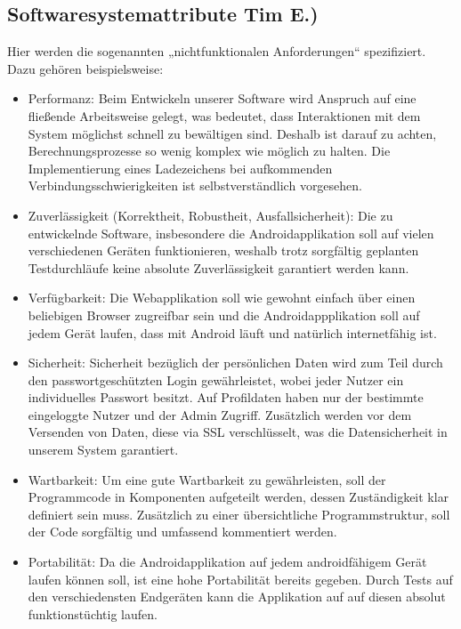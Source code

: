 \documentclass[fontsize=12pt,paper=a4,twoside]{scrartcl}
\begin{document}
\subsection{Softwaresystemattribute Tim E.)}
\label{sec:softwaresystemattribute}

  Hier werden die sogenannten „nichtfunktionalen Anforderungen“ spezifiziert. Dazu gehören beispielsweise: 
\begin{itemize}
	\item Performanz: Beim Entwickeln unserer Software wird Anspruch auf eine fließende Arbeitsweise gelegt, was bedeutet, dass Interaktionen mit dem System möglichst schnell zu bewältigen sind. Deshalb ist darauf zu achten, Berechnungsprozesse so wenig komplex wie möglich zu halten. Die Implementierung eines Ladezeichens bei aufkommenden Verbindungsschwierigkeiten ist selbstverständlich vorgesehen.
	
	\item Zuverlässigkeit (Korrektheit, Robustheit, Ausfallsicherheit): Die zu entwickelnde Software, insbesondere die Androidapplikation soll auf vielen verschiedenen Geräten funktionieren, weshalb trotz sorgfältig geplanten Testdurchläufe keine absolute Zuverlässigkeit garantiert werden kann. 
	
	\item Verfügbarkeit: Die Webapplikation soll wie gewohnt einfach über einen beliebigen Browser zugreifbar sein und die Androidappplikation soll auf jedem Gerät laufen, dass mit Android läuft und natürlich internetfähig ist. 
	
	\item Sicherheit: Sicherheit bezüglich der persönlichen Daten wird zum Teil durch den passwortgeschützten Login gewährleistet, wobei jeder Nutzer ein individuelles Passwort besitzt. Auf Profildaten haben nur der bestimmte eingeloggte Nutzer und der Admin Zugriff. Zusätzlich werden vor dem Versenden von Daten, diese via SSL verschlüsselt, was die Datensicherheit in unserem System garantiert.
	
	\item Wartbarkeit: Um eine gute Wartbarkeit zu gewährleisten, soll der Programmcode in Komponenten aufgeteilt werden, dessen Zuständigkeit klar definiert sein muss. Zusätzlich zu einer übersichtliche Programmstruktur, soll der Code sorgfältig und umfassend kommentiert werden.
	
	\item Portabilität: Da die Androidapplikation auf jedem androidfähigem Gerät laufen können soll, ist eine hohe Portabilität bereits gegeben. Durch Tests auf den verschiedensten Endgeräten kann die Applikation auf auf diesen absolut funktionstüchtig laufen. 
\end{itemize}
\end{document}
